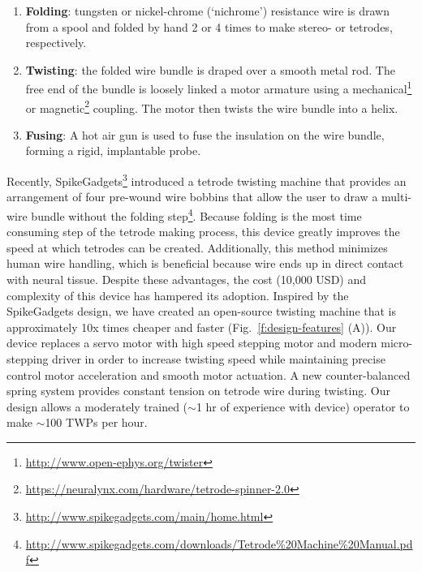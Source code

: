 \documentclass[11pt,a4paper]{article}
\begin{document}
\begin{enumerate}
    \item \textbf{Folding}: tungsten or nickel-chrome (`nichrome')
        resistance wire is drawn from a spool and folded by hand 2 or 4
        times to make stereo- or tetrodes, respectively.
    \item \textbf{Twisting}: the folded wire bundle is draped over a smooth
        metal rod. The free end of the bundle is loosely linked a motor
        armature using a mechanical\footnote{\url{http://www.open-ephys.org/twister}}
        or magnetic\footnote{\url{https://neuralynx.com/hardware/tetrode-spinner-2.0}}
        coupling.  The motor then twists the wire bundle into a helix.
    \item \textbf{Fusing}: A hot air gun is used to fuse the insulation
        on the wire bundle, forming a rigid, implantable probe.
\end{enumerate}


Recently,
SpikeGadgets\footnote{\url{http://www.spikegadgets.com/main/home.html}}
introduced a tetrode twisting machine that provides an arrangement of four
pre-wound wire bobbins that allow the user to draw a multi-wire bundle without
the folding
step\footnote{\url{http://www.spikegadgets.com/downloads/Tetrode\%20Machine\%20Manual.pdf}}.
Because folding is the most time consuming step of the tetrode making process,
this device greatly improves the speed at which tetrodes can be created.
Additionally, this method minimizes human wire handling, which is beneficial
because wire ends up in direct contact with neural tissue. Despite these
advantages, the cost (10,000 USD) and complexity of this device has hampered
its adoption. Inspired by the SpikeGadgets design, we have created an
open-source twisting machine that is approximately 10x times cheaper and faster
(Fig.~\ref{f:design-features} (A)). Our device replaces a servo motor with high
speed stepping motor and modern micro-stepping driver in order to increase
twisting speed while maintaining precise control motor acceleration and smooth
motor actuation. A new counter-balanced spring system provides constant tension
on tetrode wire during twisting. Our design allows a moderately trained
($\sim$1 hr of experience with device) operator to make $\sim$100 TWPs per
hour.
\end{document}
